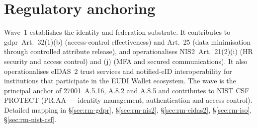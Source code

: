 \section{Regulatory anchoring}
\label{sec:w1-regulatory}

\noindent Wave~1 establishes the identity-and-federation
substrate. It contributes to \gls{gdpr}~Art.~32(1)(b)
(access-control effectiveness) and Art.~25 (data minimisation
through controlled attribute release), and operationalises
NIS2~Art.~21(2)(i) (HR security and access control) and (j)
(MFA and secured communications). It also operationalises
eIDAS~2 trust services and notified-eID interoperability for
institutions that participate in the EUDI Wallet ecosystem. The
wave is the principal anchor of 27001~A.5.16, A.8.2 and A.8.5
and contributes to NIST CSF \textsf{PROTECT} (PR.AA --- identity
management, authentication and access control). Detailed mapping
in  \S\ref{sec:rm-gdpr},
\S\ref{sec:rm-nis2}, \S\ref{sec:rm-eidas2},
\S\ref{sec:rm-iso}, \S\ref{sec:rm-nist-csf}.
